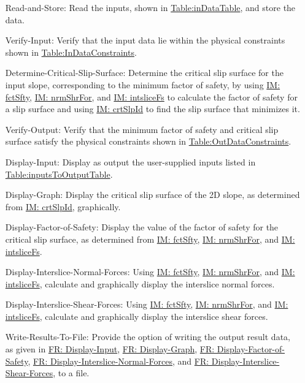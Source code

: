 \documentclass[12pt]{article}
\begin{document}
\begin{itemize}
\item[Read-and-Store:\phantomsection\label{readAndStore}]Read the inputs, shown in \hyperref[Table:inDataTable]{Table:inDataTable}, and store the data.
\item[Verify-Input:\phantomsection\label{verifyInput}]Verify that the input data lie within the physical constraints shown in \hyperref[Table:InDataConstraints]{Table:InDataConstraints}.
\item[Determine-Critical-Slip-Surface:\phantomsection\label{determineCritSlip}]Determine the critical slip surface for the input slope, corresponding to the minimum factor of safety, by using \hyperref[IM:fctSfty]{IM: fctSfty}, \hyperref[IM:nrmShrFor]{IM: nrmShrFor}, and \hyperref[IM:intsliceFs]{IM: intsliceFs} to calculate the factor of safety for a slip surface and using \hyperref[IM:crtSlpId]{IM: crtSlpId} to find the slip surface that minimizes it.
\item[Verify-Output:\phantomsection\label{verifyOutput}]Verify that the minimum factor of safety and critical slip surface satisfy the physical constraints shown in \hyperref[Table:OutDataConstraints]{Table:OutDataConstraints}.
\item[Display-Input:\phantomsection\label{displayInput}]Display as output the user-supplied inputs listed in \hyperref[Table:inputsToOutputTable]{Table:inputsToOutputTable}.
\item[Display-Graph:\phantomsection\label{displayGraph}]Display the critical slip surface of the 2D slope, as determined from \hyperref[IM:crtSlpId]{IM: crtSlpId}, graphically.
\item[Display-Factor-of-Safety:\phantomsection\label{displayFS}]Display the value of the factor of safety for the critical slip surface, as determined from \hyperref[IM:fctSfty]{IM: fctSfty}, \hyperref[IM:nrmShrFor]{IM: nrmShrFor}, and \hyperref[IM:intsliceFs]{IM: intsliceFs}.
\item[Display-Interslice-Normal-Forces:\phantomsection\label{displayNormal}]Using \hyperref[IM:fctSfty]{IM: fctSfty}, \hyperref[IM:nrmShrFor]{IM: nrmShrFor}, and \hyperref[IM:intsliceFs]{IM: intsliceFs}, calculate and graphically display the interslice normal forces.
\item[Display-Interslice-Shear-Forces:\phantomsection\label{displayShear}]Using \hyperref[IM:fctSfty]{IM: fctSfty}, \hyperref[IM:nrmShrFor]{IM: nrmShrFor}, and \hyperref[IM:intsliceFs]{IM: intsliceFs}, calculate and graphically display the interslice shear forces.
\item[Write-Results-To-File:\phantomsection\label{writeToFile}]Provide the option of writing the output result data, as given in \hyperref[displayInput]{FR: Display-Input}, \hyperref[displayGraph]{FR: Display-Graph}, \hyperref[displayFS]{FR: Display-Factor-of-Safety}, \hyperref[displayNormal]{FR: Display-Interslice-Normal-Forces}, and \hyperref[displayShear]{FR: Display-Interslice-Shear-Forces}, to a file.
\end{itemize}
\end{document}
